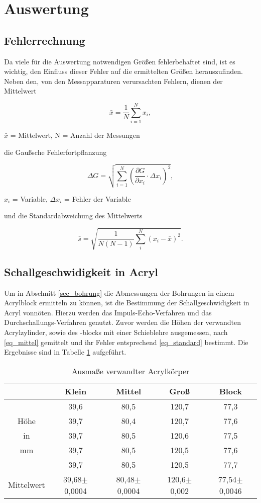 \section{Auswertung}
\subsection{Fehlerrechnung}
Da viele für die Auswertung notwendigen Größen fehlerbehaftet sind, ist es wichtig, den Einfluss dieser Fehler auf die ermittelten
Größen herauszufinden. Neben den, von den Messapparaturen verursachten Fehlern, dienen der Mittelwert
\begin{formel}
\begin{equation}
 \bar{x} = \frac1N \sum_{i=1}^{N} x_i,
 \label{eq_mittel}
\end{equation}
\caption*{\small{$\bar{x}$ = Mittelwert, N = Anzahl der Messungen}}
\end{formel}

die Gaußsche Fehlerfortpflanzung

\begin{formel}
\begin{equation}
\Delta G = \sqrt{\sum_{i=1}^{N}\left( \frac{\partial G}{\partial x_i}\cdot \Delta x_i\right)^2},
\label{gauss}
\end{equation}
\caption*{$x_i$ = Variable, $\Delta x_i$ = Fehler der Variable}
\end{formel}
und die Standardabweichung des Mittelwerts

\begin{equation}
 \bar s = \sqrt{\frac{1}{N(N-1)} \sum_{i}^{N} (x_i - \bar{x})^2}.
 \label{eq_standard}
\end{equation}

\subsection{Schallgeschwidigkeit in Acryl}
Um in Abschnitt \ref{sec_bohrung} die Abmessungen der Bohrungen in einem Acrylblock ermitteln zu können, ist die Bestimmung der Schallgeschwidigkeit 
in Acryl vonnöten. Hierzu werden das Impuls-Echo-Verfahren und das Durchschallungs-Verfahren genutzt. Zuvor werden die Höhen der verwandten
Acrylzylinder, sowie des -blocks mit einer Schieblehre ausgemessen, nach \eqref{eq_mittel} gemittelt und ihr Fehler entsprechend 
\eqref{eq_standard} bestimmt. Die Ergebnisse sind in Tabelle \ref{tab_masse} aufgeführt.

\begin{table}[H]
 \begin{tabular}{c|c|c|c|c}
  & Klein & Mittel & Groß & Block\\
  \hline
	&39,6&	80,5&	120,7&	77,3\\
Höhe 	&39,7&	80,4&	120,7&	77,6\\
in 	&39,7&	80,5&	120,6&	77,5\\
mm 	&39,7&	80,5&	120,5&	77,6\\
	&39,7&	80,5&	120,5&	77,7\\
	\hline
Mittelwert	&39,68$\pm$0,0004&	80,48$\pm$0,0004 &	120,6$\pm$0,002&	77,54$\pm$0,0046
 \end{tabular}
 \caption{Ausmaße verwandter Acrylkörper}
\label{tab_masse}
\end{table}


